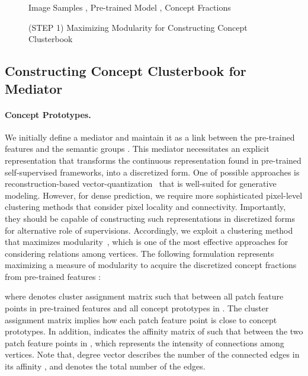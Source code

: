 \documentclass{article} \usepackage{iclr2024_conference,times}
\begin{document}
\begin{figure}[t!]
\vspace{-12mm}
\begin{algorithm}[H]
\caption{(STEP 1) Maximizing Modularity for Constructing Concept Clusterbook }
\begin{algorithmic}[1]
\Require Image Samples , Pre-trained Model , Concept Fractions 
\State {} 
\For {}
\State  {}
\State  {}
\State  {}
\State  {}
\State  {}
\State  {}
\EndFor
\end{algorithmic}
\label{alg:mediator}
\end{algorithm}
\vspace{-7mm}
\end{figure} 
\subsection{Constructing Concept Clusterbook for Mediator}
\label{sec:3.2}
\paragraph{Concept Prototypes.} We initially define a mediator  and maintain it as a link between the pre-trained features  and the semantic groups . This mediator necessitates an explicit representation that transforms the continuous representation found in pre-trained self-supervised frameworks, into a discretized form. One of possible approaches is reconstruction-based vector-quantization~\citep{van2017neural, esser2021taming} that is well-suited for generative modeling. However, for dense prediction, we require more sophisticated pixel-level clustering methods that consider pixel locality and connectivity. Importantly, they should be capable of constructing such representations in discretized forms for alternative role of supervisions. Accordingly, we exploit a clustering method that maximizes modularity~\citep{newman2006modularity}, which is one of the most effective approaches for considering relations among vertices. The following formulation represents maximizing a measure of modularity  to acquire the discretized concept fractions from pre-trained features :

where  denotes cluster assignment matrix such that  between all  patch feature points in pre-trained features  and all  concept prototypes in . The cluster assignment matrix implies how each patch feature point is close to concept prototypes. In addition,  indicates the affinity matrix of  such that  between the two patch feature points  in , which represents the intensity of connections among vertices. Note that, degree vector  describes the number of the connected edges in its affinity , and  denotes the total number of the edges. 
\end{document}
